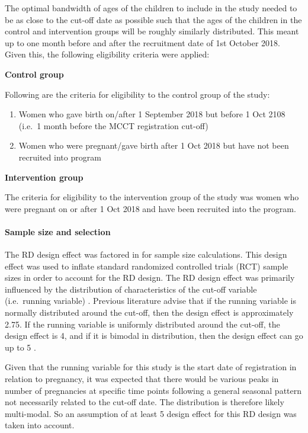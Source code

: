 \documentclass[12pt,a4paper]{article}
\let\oldparagraph\paragraph
\renewcommand{\paragraph}[1]{\oldparagraph{#1}\mbox{}}
\begin{document}
The optimal bandwidth of ages of the children to include in the study needed to be as close to the cut-off date as possible such that the ages of the children in the control and intervention groups will be roughly similarly distributed. This meant up to one month before and after the recruitment date of 1st October 2018. Given this, the following eligibility criteria were applied:

\textbf{Control group}

Following are the criteria for eligibility to the control group of the study:

\begin{enumerate}
\def\labelenumi{\arabic{enumi}.}
\item
  Women who gave birth on/after 1 September 2018 but before 1 Oct 2108 (i.e.~1 month before the MCCT registration cut-off)
\item
  Women who were pregnant/gave birth after 1 Oct 2018 but have not been recruited into program
\end{enumerate}

\textbf{Intervention group}

The criteria for eligibility to the intervention group of the study was women who were pregnant on or after 1 Oct 2018 and have been recruited into the program.

\hypertarget{sample-size-2}{%
\paragraph{Sample size and selection}\label{sample-size-2}}

The RD design effect was factored in for sample size calculations. This design effect was used to inflate standard randomized controlled trials (RCT) sample sizes in order to account for the RD design. The RD design effect was primarily influenced by the distribution of characteristics of the cut-off variable (i.e.~running variable) \citep{Bor2014}. Previous literature advise that if the running variable is normally distributed around the cut-off, then the design effect is approximately 2.75. If the running variable is uniformly distributed around the cut-off, the design effect is 4, and if it is bimodal in distribution, then the design effect can go up to 5 \citep{Schochet2009}.

Given that the running variable for this study is the start date of registration in relation to pregnancy, it was expected that there would be various peaks in number of pregnancies at specific time points following a general seasonal pattern not necessarily related to the cut-off date. The distribution is therefore likely multi-modal. So an assumption of at least 5 design effect for this RD design was taken into account.
\end{document}
